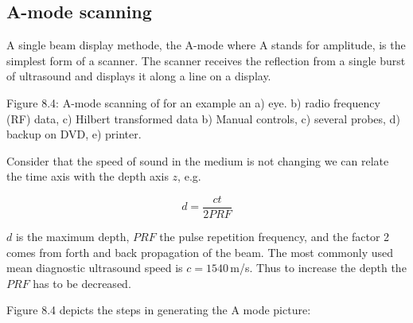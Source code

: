 \documentclass{article}
\begin{document}
    \begin{figure}
        \begin{center}\end{center}
        \caption{}
        \label{}
    \end{figure}
    
\subsection{A-mode scanning}\label{a-mode-scanning}

A single beam display methode, the A-mode where A stands for amplitude,
is the simplest form of a scanner. The scanner receives the reflection
from a single burst of ultrasound and displays it along a line on a
display.

Figure 8.4: A-mode scanning of for an example an a) eye. b) radio
frequency (RF) data, c) Hilbert transformed data b) Manual controls, c)
several probes, d) backup on DVD, e) printer.

Consider that the speed of sound in the medium is not changing we can
relate the time axis with the depth axis \(z\), e.g.

\begin{equation}
d=\frac{c t}{2 PRF}
\end{equation}

\(d\) is the maximum depth, \(PRF\) the pulse repetition frequency, and
the factor 2 comes from forth and back propagation of the beam. The most
commonly used mean diagnostic ultrasound speed is \(c=1540\,\)m/s. Thus
to increase the depth the \(PRF\) has to be decreased.

Figure 8.4 depicts the steps in generating the A mode picture:
\end{document}
